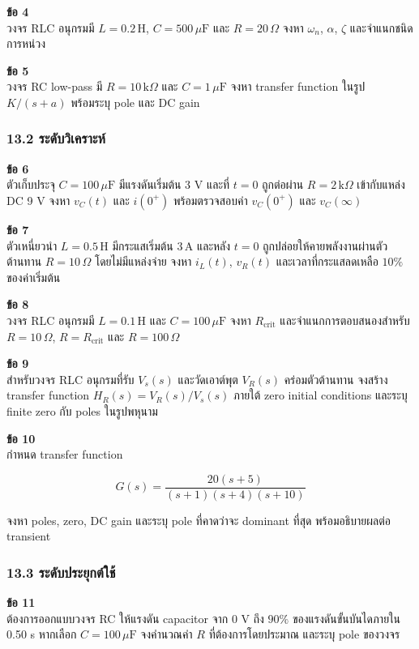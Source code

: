 \textbf{ข้อ 4}\\
วงจร RLC อนุกรมมี $L=0.2\,\text{H}$, $C=500\,\mu\text{F}$ และ $R=20\,\Omega$ จงหา $\omega_n$, $\alpha$, $\zeta$ และจำแนกชนิดการหน่วง

\textbf{ข้อ 5}\\
วงจร RC low-pass มี $R=10\,\text{k}\Omega$ และ $C=1\,\mu\text{F}$ จงหา transfer function ในรูป $K/(s+a)$ พร้อมระบุ pole และ DC gain

\subsubsection{13.2 ระดับวิเคราะห์}

\textbf{ข้อ 6}\\
ตัวเก็บประจุ $C=100\,\mu\text{F}$ มีแรงดันเริ่มต้น 3 V และที่ $t=0$ ถูกต่อผ่าน $R=2\,\text{k}\Omega$ เข้ากับแหล่ง DC 9 V จงหา $v_C(t)$ และ $i(0^+)$ พร้อมตรวจสอบค่า $v_C(0^+)$ และ $v_C(\infty)$

\textbf{ข้อ 7}\\
ตัวเหนี่ยวนำ $L=0.5\,\text{H}$ มีกระแสเริ่มต้น $3\,\text{A}$ และหลัง $t=0$ ถูกปล่อยให้คายพลังงานผ่านตัวต้านทาน $R=10\,\Omega$ โดยไม่มีแหล่งจ่าย จงหา $i_L(t)$, $v_R(t)$ และเวลาที่กระแสลดเหลือ $10\%$ ของค่าเริ่มต้น

\textbf{ข้อ 8}\\
วงจร RLC อนุกรมมี $L=0.1\,\text{H}$ และ $C=100\,\mu\text{F}$ จงหา $R_{\text{crit}}$ และจำแนกการตอบสนองสำหรับ $R=10\,\Omega$, $R=R_{\text{crit}}$ และ $R=100\,\Omega$

\textbf{ข้อ 9}\\
สำหรับวงจร RLC อนุกรมที่รับ $V_s(s)$ และวัดเอาต์พุต $V_R(s)$ คร่อมตัวต้านทาน จงสร้าง transfer function $H_R(s)=V_R(s)/V_s(s)$ ภายใต้ zero initial conditions และระบุ finite zero กับ poles ในรูปพหุนาม

\textbf{ข้อ 10}\\
กำหนด transfer function

\[
G(s)=\frac{20(s+5)}{(s+1)(s+4)(s+10)}
\]

จงหา poles, zero, DC gain และระบุ pole ที่คาดว่าจะ dominant ที่สุด พร้อมอธิบายผลต่อ transient

\subsubsection{13.3 ระดับประยุกต์ใช้}

\textbf{ข้อ 11}\\
ต้องการออกแบบวงจร RC ให้แรงดัน capacitor จาก 0 V ถึง $90\%$ ของแรงดันขั้นบันไดภายใน 0.50 s หากเลือก $C=100\,\mu\text{F}$ จงคำนวณค่า $R$ ที่ต้องการโดยประมาณ และระบุ pole ของวงจร

